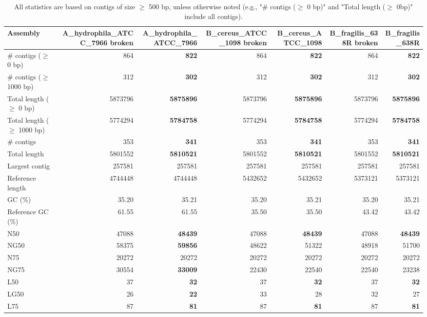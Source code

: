 \documentclass[12pt,a4paper]{article}
\begin{document}
\begin{table}[ht]
\begin{center}
\caption{All statistics are based on contigs of size $\geq$ 500 bp, unless otherwise noted (e.g., "\# contigs ($\geq$ 0 bp)" and "Total length ($\geq$ 0bp)" include all contigs).}
\begin{tabular}{|l*{6}{|r}|}
\hline
Assembly & A\_hydrophila\_ATCC\_7966 broken & A\_hydrophila\_ATCC\_7966 & B\_cereus\_ATCC\_1098 broken & B\_cereus\_ATCC\_1098 & B\_fragilis\_638R broken & B\_fragilis\_638R \\ \hline
\# contigs ($\geq$ 0 bp) & 864 & {\bf 822} & 864 & {\bf 822} & 864 & {\bf 822} \\ \hline
\# contigs ($\geq$ 1000 bp) & 312 & {\bf 302} & 312 & {\bf 302} & 312 & {\bf 302} \\ \hline
Total length ($\geq$ 0 bp) & 5873796 & {\bf 5875896} & 5873796 & {\bf 5875896} & 5873796 & {\bf 5875896} \\ \hline
Total length ($\geq$ 1000 bp) & 5774294 & {\bf 5784758} & 5774294 & {\bf 5784758} & 5774294 & {\bf 5784758} \\ \hline
\# contigs & 353 & {\bf 341} & 353 & {\bf 341} & 353 & {\bf 341} \\ \hline
Total length & 5801552 & {\bf 5810521} & 5801552 & {\bf 5810521} & 5801552 & {\bf 5810521} \\ \hline
Largest contig & 257581 & 257581 & 257581 & 257581 & 257581 & 257581 \\ \hline
Reference length & 4744448 & 4744448 & 5432652 & 5432652 & 5373121 & 5373121 \\ \hline
GC (\%) & 35.20 & 35.21 & 35.20 & 35.21 & 35.20 & 35.21 \\ \hline
Reference GC (\%) & 61.55 & 61.55 & 35.50 & 35.50 & 43.42 & 43.42 \\ \hline
N50 & 47088 & {\bf 48439} & 47088 & {\bf 48439} & 47088 & {\bf 48439} \\ \hline
NG50 & 58375 & {\bf 59856} & 48622 & 51322 & 48918 & 51700 \\ \hline
N75 & 20272 & 20272 & 20272 & 20272 & 20272 & 20272 \\ \hline
NG75 & 30554 & {\bf 33009} & 22430 & 22540 & 22540 & 23238 \\ \hline
L50 & 37 & {\bf 32} & 37 & {\bf 32} & 37 & {\bf 32} \\ \hline
LG50 & 26 & {\bf 22} & 33 & 28 & 32 & 27 \\ \hline
L75 & 87 & {\bf 81} & 87 & {\bf 81} & 87 & {\bf 81} \\ \hline

\end{tabular}
\end{center}
\end{table}
\end{document}
